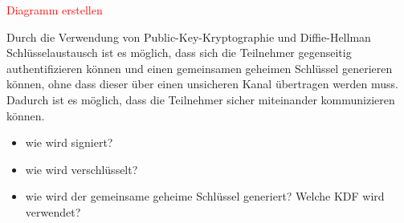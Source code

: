 \textcolor{red}{Diagramm erstellen}

\noindent Durch die Verwendung von Public-Key-Kryptographie und Diffie-Hellman Schlüsselaustausch ist es möglich, dass sich die Teilnehmer gegenseitig authentifizieren können und einen gemeinsamen geheimen Schlüssel generieren können, ohne dass dieser über einen unsicheren Kanal übertragen werden muss. Dadurch ist es möglich, dass die Teilnehmer sicher miteinander kommunizieren können. 

\begin{itemize}
    \item wie wird signiert?
    \item wie wird verschlüsselt?
    \item wie wird der gemeinsame geheime Schlüssel generiert? Welche KDF wird verwendet?
\end{itemize}